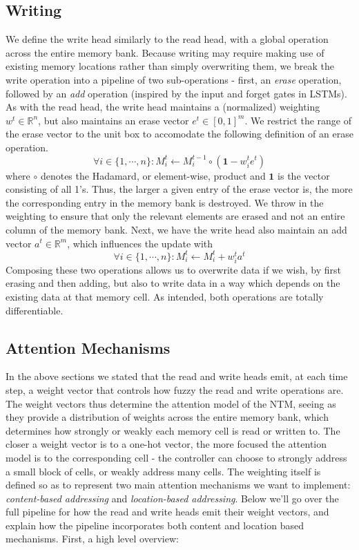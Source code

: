 \documentclass{article}
\begin{document}
\subsection{Writing}
We define the write head similarly to the read head, with a global operation across the entire memory bank. Because writing may require making use of existing memory locations rather than simply overwriting them, we break the write operation into a pipeline of two sub-operations - first, an \textit{erase} operation, followed by an \textit{add} operation (inspired by the input and forget gates in LSTMs). As with the read head, the write head maintains a (normalized) weighting $ w^t \in \mathbb{R}^n $, but also maintains an erase vector $ e^t \in [0, 1]^m $. We restrict the range of the erase vector to the unit box to accomodate the following definition of an erase operation.
$$ \forall i \in \{ 1, \cdots, n \}: M_i^t \gets M^{t - 1}_i \circ (\mathbf{1} - w_i^t e^t) $$
where $ \circ $ denotes the Hadamard, or element-wise, product and $ \mathbf{1} $ is the vector consisting of all 1's. Thus, the larger a given entry of the erase vector is, the more the corresponding entry in the memory bank is destroyed. We throw in the weighting to ensure that only the relevant elements are erased and not an entire column of the memory bank. Next, we have the write head also maintain an add vector $ a^t \in \mathbb{R}^m $, which influences the update with
$$ \forall i \in \{ 1, \cdots, n \}: M_i^t \gets M_i^t + w_i^t a^t $$
Composing these two operations allows us to overwrite data if we wish, by first erasing and then adding, but also to write data in a way which depends on the existing data at that memory cell. As intended, both operations are totally differentiable.

\subsection{Attention Mechanisms}
In the above sections we stated that the read and write heads emit, at each time step, a weight vector that controls how fuzzy the read and write operations are. The weight vectors thus determine the attention model of the NTM, seeing as they provide a distribution of weights across the entire memory bank, which determines how strongly or weakly each memory cell is read or written to. The closer a weight vector is to a one-hot vector, the more focused the attention model is to the corresponding cell - the controller can choose to strongly address a small block of cells, or weakly address many cells. The weighting itself is defined so as to represent two main attention mechanisms we want to implement: \textit{content-based addressing} and \textit{location-based addressing}.
\newline
Below we'll go over the full pipeline for how the read and write heads emit their weight vectors, and explain how the pipeline incorporates both content and location based mechanisms. First, a high level overview:
\end{document}
